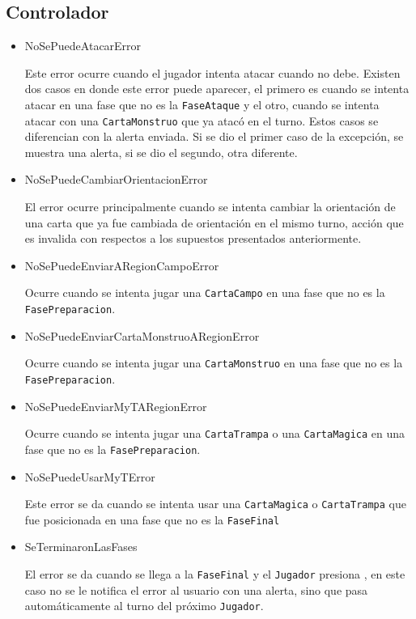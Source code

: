 	\subsection{Controlador}
	
	\begin{itemize}
		\item NoSePuedeAtacarError
		
		Este error ocurre cuando el jugador intenta atacar cuando no debe. Existen dos casos en donde este error puede aparecer, el primero es cuando se intenta atacar en una fase que no es la \texttt{FaseAtaque} y el otro, cuando se intenta atacar con una \texttt{CartaMonstruo} que ya atacó en el turno. Estos casos se diferencian con la alerta enviada. Si se dio el primer caso de la excepción, se muestra una alerta, si se dio el segundo, otra diferente.
		
		\item NoSePuedeCambiarOrientacionError
		
		El error ocurre principalmente cuando se intenta cambiar la orientación de una carta que ya fue cambiada de orientación en el mismo turno, acción que es invalida con respectos a los supuestos presentados anteriormente.
		
		\item NoSePuedeEnviarARegionCampoError
		
		Ocurre cuando se intenta jugar una \texttt{CartaCampo} en una fase que no es la \texttt{FasePreparacion}. 
		
		\item NoSePuedeEnviarCartaMonstruoARegionError
		
		Ocurre cuando se intenta jugar una \texttt{CartaMonstruo} en una fase que no es la \texttt{FasePreparacion}.
		
		\item NoSePuedeEnviarMyTARegionError
		
		Ocurre cuando se intenta jugar una \texttt{CartaTrampa} o una \texttt{CartaMagica} en una fase que no es la \texttt{FasePreparacion}.
		
		\item NoSePuedeUsarMyTError
		
		Este error se da cuando se intenta usar una \texttt{CartaMagica} o \texttt{CartaTrampa} que fue posicionada en una fase que no es la \texttt{FaseFinal}
		
		\item SeTerminaronLasFases
		
		El error se da cuando se llega a la \texttt{FaseFinal} y el \texttt{Jugador} presiona , en este caso no se le notifica el error al usuario con una alerta, sino que pasa automáticamente al turno del próximo \texttt{Jugador}.
		
	\end{itemize}
	
